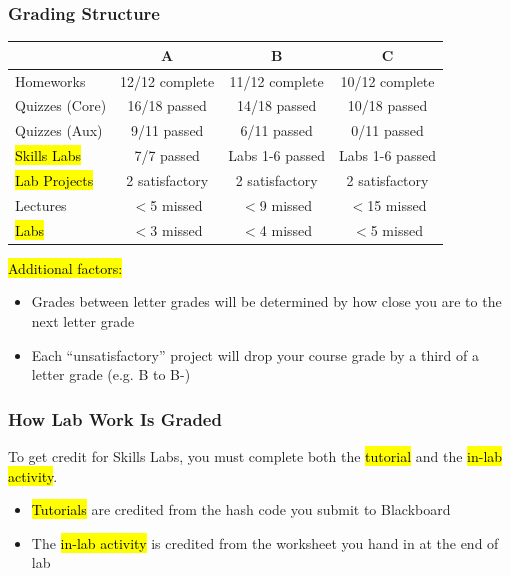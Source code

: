 \documentclass[slidestop,compress,mathserif]{beamer}
\begin{document}
\begin{frame}
	\frametitle{Grading Structure} %
	\begin{table}[ht]
	\centering
	\small
	\begin{tabular}{|l|c|c|c|}
	\hline
	 & \textbf{A} & \textbf{B} & \textbf{C} \\
	\hline
	Homeworks & 12/12 complete & 11/12 complete & 10/12 complete \\
	\hline
	Quizzes (Core) & 16/18 passed & 14/18 passed & 10/18 passed \\
	\hline
	Quizzes (Aux) & 9/11 passed & 6/11 passed & 0/11 passed \\
	\hline
	\hl{Skills Labs} & 7/7 passed & Labs 1-6 passed & Labs 1-6 passed \\
	\hline
	\hl{Lab Projects} & 2 satisfactory & 2 satisfactory & 2 satisfactory \\
	\hline
	Lectures & $<$5 missed & $<$9 missed & $<$15 missed \\
	\hline
	\hl{Labs} & $<$3 missed & $<$4 missed & $<$5 missed \\
	\hline
	\end{tabular}
	\end{table}

	\hl{Additional factors:}
	\begin{itemize}
		\item Grades between letter grades will be determined by how close you are to the next letter grade
		\item Each ``unsatisfactory'' project will drop your course grade by a third of a letter grade (e.g. B to B-)
	\end{itemize}
\end{frame}


\begin{frame}
	\frametitle{How Lab Work Is Graded}
	To get credit for Skills Labs, you must complete both the \hl{tutorial} and the \hl{in-lab activity}.
	\begin{itemize}
		\item \hl{Tutorials} are credited from the hash code you submit to Blackboard
		\item The \hl{in-lab activity} is credited from the worksheet you hand in at the end of lab
	\end{itemize}
\end{frame}
\end{document}
